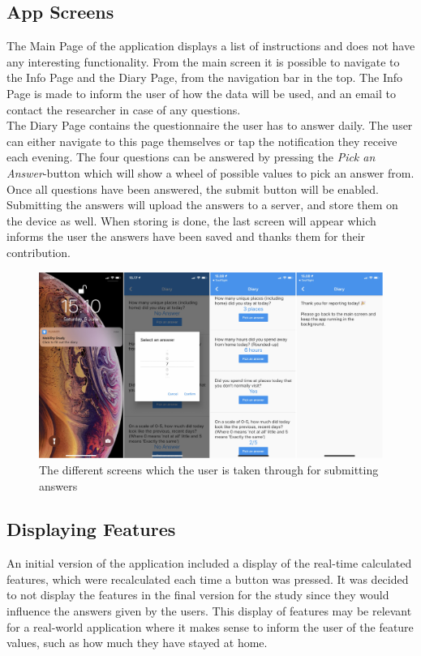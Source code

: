 \subsection{App Screens}
The Main Page of the application displays a list of instructions and does not have any interesting functionality. From the main screen it is possible to navigate to the Info Page and the Diary Page, from the navigation bar in the top. The Info Page is made to inform the user of how the data will be used, and an email to contact the researcher in case of any questions. \\

The Diary Page contains the questionnaire the user has to answer daily. The user can either navigate to this page themselves or tap the notification they receive each evening. The four questions can be answered by pressing the \textit{Pick an Answer}-button which will show a wheel of possible values to pick an answer from. Once all questions have been answered, the submit button will be enabled. Submitting the answers will upload the answers to a server, and store them on the device as well. When storing is done, the last screen will appear which informs the user the answers have been saved and thanks them for their contribution.

\begin{figure}
    \centering
    \includegraphics[width=\textwidth]{images/app_imgs/screens-answers.pdf}
    \caption{The different screens which the user is taken through for submitting answers}
    \label{fig:screens-answers}
\end{figure}

\subsection{Displaying Features}
An initial version of the application included a display of the real-time calculated features, which were recalculated each time a button was pressed. It was decided to not display the features in the final version for the study since they would influence the answers given by the users. This display of features may be relevant for a real-world application where it makes sense to inform the user of the feature values, such as how much they have stayed at home.


